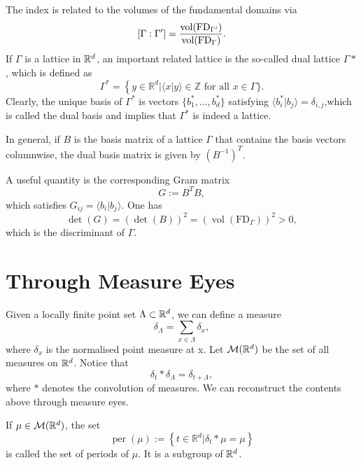 \documentclass{article}
\begin{document}
The index is related to the volumes of the fundamental domains via
\[[\Gamma:\Gamma']=\frac{\operatorname{vol}(\operatorname{FD}_{\Gamma'})}{\operatorname{vol}(\operatorname{FD}_{\Gamma})}.\]
If $\Gamma$ is a lattice in $\mathbb{R}^d$, an important related lattice is the so-called dual lattice $\Gamma*$, which is defined as
\[
\Gamma^{*}=\left\{y \in \mathbb{R}^{d}|\langle x | y\rangle \in \mathbb{Z} \text { for all } x \in \Gamma\}\right..
\]
Clearly, the unique basis of $\Gamma^*$ is vectors $\{b_1^*,\dots,b_d^*\}$ satisfying $\langle b_i^*|b_j\rangle=\delta_{i,j}$,which is called the dual basis and implies that $\Gamma^*$ is indeed a lattice.

In general, if $B$ is the basis matrix of a lattice $\Gamma$ that contains the basis vectors columnwise, the dual basis matrix is given by $(B^{-1})^T$.

A useful quantity is the corresponding Gram matrix
\[G:=B^TB,\]
which satisfies $G_{ij}=\langle b_i|b_j\rangle.$ One has
$$ 
\operatorname{det}(G)=(\operatorname{det}(B))^{2}=\left(\operatorname{vol}\left(\mathrm{FD}_{\Gamma}\right)\right)^{2}>0,
$$ which is the discriminant of $\Gamma$.

\section{Through Measure Eyes}
Given a locally finite point set $\Lambda\subset\mathbb{R}^d$, we can define a measure
\[\delta_{\Lambda}=\sum_{x\in\Lambda}\delta_x,\]
where $\delta_x$ is the normalised point measure at x.  Let $\mathcal{M}(\mathbb{R}^d)$ be the set of all measures on $\mathbb{R}^d$. Notice that
\[\delta_t*\delta_{\Lambda}=\delta_{t+\Lambda},\]
where $*$ denotes the convolution of measures.
We can reconstruct the contents above through measure eyes.

If $\mu\in\mathcal{M}(\mathbb{R}^d)$, the set
$$ 
\operatorname{per}(\mu) :=\left\{t \in \mathbb{R}^{d} | \delta_{t} * \mu=\mu\right\}
$$
is called the set of periods of $\mu$. It is a subgroup of $\mathbb{R}^d$.  
\end{document}
